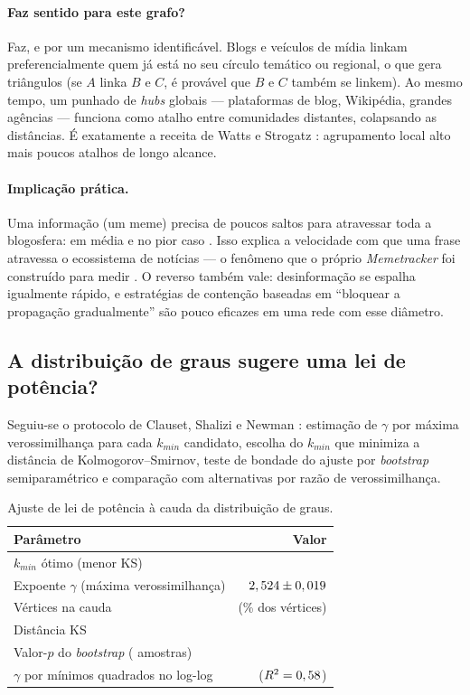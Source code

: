 \documentclass[sigconf]{webmedia}
\begin{document}
\paragraph{Faz sentido para este grafo?} Faz, e por um mecanismo
identificável. Blogs e veículos de mídia linkam preferencialmente quem já
está no seu círculo temático ou regional, o que gera triângulos
(se $A$ linka $B$ e $C$, é provável que $B$ e $C$ também se linkem).
Ao mesmo tempo, um punhado de \textit{hubs} globais --- plataformas de
blog, Wikipédia, grandes agências --- funciona como atalho entre
comunidades distantes, colapsando as distâncias. É exatamente a receita de
Watts e Strogatz \cite{watts1998}: agrupamento local alto mais poucos
atalhos de longo alcance.

\paragraph{Implicação prática.} Uma informação (um meme) precisa de
poucos saltos para atravessar toda a blogosfera: em média \swL{} e no
pior caso \diametro{}. Isso explica a velocidade com que uma frase
atravessa o ecossistema de notícias --- o fenômeno que o próprio
\textit{Memetracker} foi construído para medir \cite{leskovec2009}.
O reverso também vale: desinformação se espalha igualmente rápido, e
estratégias de contenção baseadas em ``bloquear a propagação
gradualmente'' são pouco eficazes em uma rede com esse diâmetro.

\subsection{A distribuição de graus sugere uma lei de potência?}
\label{sec:leipotencia}

Seguiu-se o protocolo de Clauset, Shalizi e Newman \cite{clauset2009}:
estimação de $\gamma$ por máxima verossimilhança para cada $k_{min}$
candidato, escolha do $k_{min}$ que minimiza a distância de
Kolmogorov--Smirnov, teste de bondade do ajuste por \textit{bootstrap}
semiparamétrico e comparação com alternativas por razão de verossimilhança.

\begin{table}[t]
\centering
\caption{Ajuste de lei de potência à cauda da distribuição de graus.}
\label{tab:leipotencia}
\small
\begin{tabular}{lr}
\hline
\textbf{Parâmetro} & \textbf{Valor} \\ \hline
$k_{min}$ ótimo (menor KS)                      & \plKmin{} \\
Expoente $\gamma$ (máxima verossimilhança)      & $2,524 \pm 0,019$ \\
Vértices na cauda                               & \plNcauda{} (\plFracCauda{}\% dos vértices) \\
Distância KS                                    & \plKS{} \\
Valor-$p$ do \textit{bootstrap} (\plBoot{} amostras) & \plPvalor{} \\
$\gamma$ por mínimos quadrados no log-log       & \plGammaOLS{} ($R^2=0,58{}$) \\
\hline
\end{tabular}
\end{table}
\end{document}
